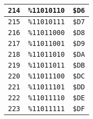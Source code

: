 \begin{multicols}{2}
\begin{center}
\begin{tabular}{|c|c|c|}
  \texttt{214} & \texttt{\%11010110} &  \texttt{\$D6} \\ \hline
  \texttt{215} & \texttt{\%11010111} &  \texttt{\$D7} \\ \hline
  \texttt{216} & \texttt{\%11011000} &  \texttt{\$D8} \\ \hline
  \texttt{217} & \texttt{\%11011001} &  \texttt{\$D9} \\ \hline
  \texttt{218} & \texttt{\%11011010} &  \texttt{\$DA} \\ \hline
  \texttt{219} & \texttt{\%11011011} &  \texttt{\$DB} \\ \hline
  \texttt{220} & \texttt{\%11011100} &  \texttt{\$DC} \\ \hline
  \texttt{221} & \texttt{\%11011101} &  \texttt{\$DD} \\ \hline
  \texttt{222} & \texttt{\%11011110} &  \texttt{\$DE} \\ \hline
  \texttt{223} & \texttt{\%11011111} &  \texttt{\$DF} \\ \hline
\end{tabular}
\end{center}


\end{multicols}
